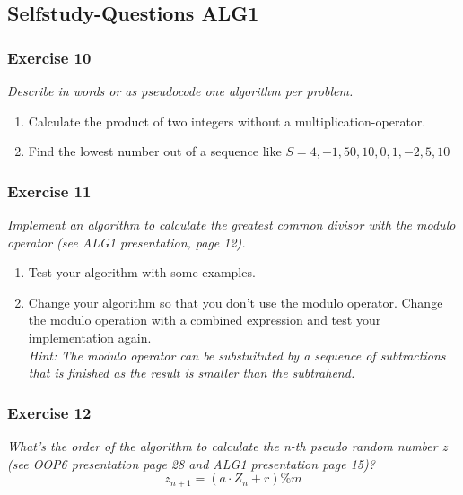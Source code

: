 \newpage
\subsection{Selfstudy-Questions ALG1}

\subsubsection*{Exercise 10}
\textit{Describe in words or as pseudocode one algorithm per problem.}\\

\begin{enumerate}[label={(\alph*)}]
	\item Calculate the product of two integers without a multiplication-operator.
	\item Find the lowest number out of a sequence like $S = {4,-1,50,10,0,1,-2,5,10}$
\end{enumerate}

\subsubsection*{Exercise 11}
\textit{Implement an algorithm to calculate the greatest common divisor
with the modulo operator (see ALG1 presentation, page 12).}\\

\begin{enumerate}[label={(\alph*)}]
	\item Test your algorithm with some examples.
	\item Change your algorithm so that you don't use the modulo operator. 
		Change the modulo operation with a combined expression and test 
		your implementation again. \\
		\textit{Hint: The modulo operator can be substuituted by a 
			sequence of subtractions that is finished as the 
			result is smaller than the subtrahend.}
\end{enumerate}

\subsubsection*{Exercise 12}
\textit{What's the order of the algorithm to calculate the n-th pseudo random 
number z (see OOP6 presentation page 28 and ALG1 presentation page 15)?}\\

\[ z_{n+1} = (a \cdot Z_n + r) \% m \]
